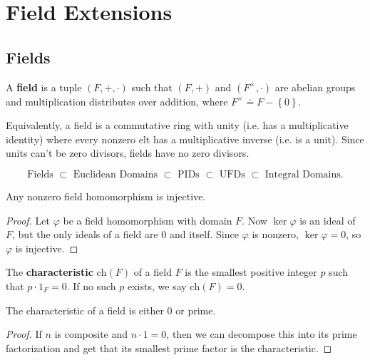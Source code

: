 \documentclass[10pt]{report}
\begin{document}
\tableofcontents


\chapter{Field Extensions}


\section{Fields}

A \textbf{field} is a tuple $(F,+,\cdot)$ such that $(F,+)$ and $(F^{\times},\cdot)$ are abelian groups and multiplication distributes over addition, where $F^{\times} \doteq F-\left\{ 0 \right\}$.

Equivalently, a field is a commutative ring with unity (i.e. has a multiplicative identity) where every nonzero elt has a multiplicative inverse (i.e. is a unit). Since units can't be zero divisors, fields have no zero divisors.

\[
	\text{Fields } \subset \text{ Euclidean Domains } \subset \text{ PIDs } \subset \text{ UFDs } \subset \text{ Integral Domains}.
\] 

\begin{prop}
	Any nonzero field homomorphism is injective.
\end{prop}
\begin{proof}
	Let $\varphi$ be a field homomorphism with domain $F$. Now $\ker \varphi$ is an ideal of $F$, but the only ideals of a field are 0 and itself. Since $\varphi$ is nonzero, $\ker\varphi=0$, so $\varphi$ is injective.
\end{proof}

\begin{defn}[]
	The \textbf{characteristic} $\text{ch}(F)$ of a field $F$ is the smallest positive integer $p$ such that $p \cdot 1_{F}=0$. If no such $p$ exists, we say $\text{ch}(F)=0$.
\end{defn}

\begin{prop}
	The characteristic of a field is either 0 or prime.
\end{prop}
\begin{proof}
	If $n$ is composite and $n \cdot 1 = 0$, then we can decompose this into its prime factorization and get that its smallest prime factor is the characteristic.
\end{proof}
\end{document}
